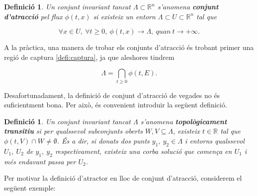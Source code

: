 \documentclass[11pt,a4paper,openright,oneside]{article}
\numberwithin{equation}{section}
\newtheorem{defi}[teo]{Definici\'o}
\theoremstyle{definition}
\begin{document}
\begin{defi} \label{def:atraccio}
    Un conjunt invariant tancat $\Lambda\subset \mathbb{R}^n$ s'anomena \textbf{conjunt d'atracció} pel flux $\phi(t,x)$ si existeix un entorn $\Lambda \subset U \subset \mathbb{R}^n$ tal que 
    
    \begin{equation*}
        \forall x \in U, \ \forall t\geq 0, \ \phi(t,x)\rightarrow{\Lambda}, \ \textit{quan} \ t\to +\infty.
    \end{equation*}
\end{defi}

A la pràctica, una manera de trobar els conjunts d'atracció és trobant primer una regió de captura \ref{defi:captura}, ja que aleshores tindrem 
 
\begin{equation*}
        \Lambda=\bigcap_{t\geq 0}\phi(t,E).
\end{equation*}
   

Desafortunadament, la definició de conjunt d'atracció de vegades no és suficientment bona. Per això, és convenient introduir la següent definició. 

\begin{defi} \label{def:top_tran}
    Un conjunt invariant tancat $\Lambda$ s'anomena \textbf{topològicament transitiu} si per qualssevol subconjunts oberts $W,V\subseteq \Lambda$, existeix $t\in\mathbb{R}$ tal que $\phi\left(t,V\right)\cap W\neq\emptyset$. És a dir, si donats dos punts $y_1, \ y_2\in \Lambda$ i entorns qualssevol $U_1, \ U_2$ de $y_1, \ y_2$ respectivament, existeix una corba solució que comença en $U_1$ i més endavant passa per $U_2$.
\end{defi}

Per motivar la definició d'atractor en lloc de conjunt d'atracció, considerem el següent exemple:
\end{document}
